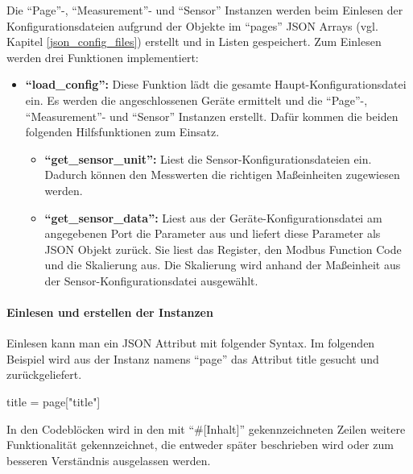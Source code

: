 Die \enquote{Page}-, \enquote{Measurement}- und \enquote{Sensor} Instanzen werden beim Einlesen der Konfigurationsdateien aufgrund der Objekte im \enquote{pages} JSON Arrays (vgl. Kapitel \ref{json_config_files}) erstellt und in Listen gespeichert. \newline
Zum Einlesen werden drei Funktionen implementiert:
\begin{itemize}
	\item \textbf{\enquote{load\_config}:} Diese Funktion lädt die gesamte Haupt-Konfigurationsdatei ein. Es werden die angeschlossenen Geräte ermittelt und die \enquote{Page}-, \enquote{Measurement}- und \enquote{Sensor} Instanzen erstellt. Dafür kommen die beiden folgenden Hilfsfunktionen zum Einsatz.
    \begin{itemize}
		\item \textbf{\enquote{get\_sensor\_unit}:} Liest die Sensor-Konfigurationsdateien ein. Dadurch können den Messwerten die richtigen Maßeinheiten zugewiesen werden.
		\item \textbf{\enquote{get\_sensor\_data}:} Liest aus der Geräte-Konfigurationsdatei am angegebenen Port die Parameter aus und liefert diese Parameter als JSON Objekt zurück. Sie liest das Register, den Modbus Function Code und die Skalierung aus. Die Skalierung wird anhand der Maßeinheit aus der Sensor-Konfigurationsdatei ausgewählt.
	\end{itemize}
\end{itemize}

\paragraph{Einlesen und erstellen der Instanzen}
Einlesen kann man ein JSON Attribut mit folgender Syntax. Im folgenden Beispiel wird aus der Instanz namens \enquote{page} das Attribut title gesucht und zurückgeliefert.
\begin{pythoncode}
title = page["title"]
\end{pythoncode}

In den Codeblöcken wird in den mit \enquote{\#[Inhalt]} gekennzeichneten Zeilen weitere Funktionalität gekennzeichnet, die entweder später beschrieben wird oder zum besseren Verständnis ausgelassen werden. 

